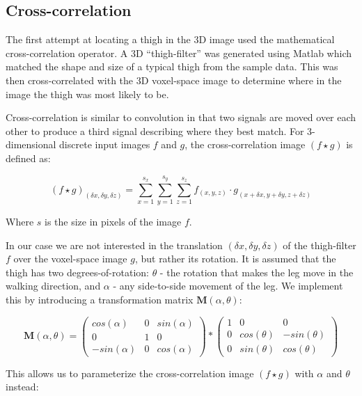 \subsection{Cross-correlation}

The first attempt at locating a thigh in the 3D image used the mathematical cross-correlation operator.
A 3D ``thigh-filter'' was generated using Matlab which matched the shape and size of a typical thigh from the sample data.
This was then cross-correlated with the 3D voxel-space image to determine where in the image the thigh was most likely to be.

\bigskip
\noindent Cross-correlation is similar to convolution in that two signals are moved over each other to produce a third signal describing where they best match.
For 3-dimensional discrete input images $f$ and $g$, the cross-correlation image $(f \star g)$ is defined as:

\begin{equation}
	(f \star g)_{(\delta x,\delta y,\delta z)} = \sum_{x=1}^{s_{x}} \sum_{y=1}^{s_{y}} \sum_{z=1}^{s_{z}} f_{(x,y,z)} \cdot g_{(x+\delta x,y+\delta y, z+\delta z)}
\end{equation}

Where $s$ is the size in pixels of the image $f$.

In our case we are not interested in the translation $(\delta x,\delta y,\delta z)$ of the thigh-filter $f$ over the voxel-space image $g$, but rather its rotation.
It is assumed that the thigh has two degrees-of-rotation: $\theta$ - the rotation that makes the leg move in the walking direction, and $\alpha$ - any side-to-side movement of the leg.
We implement this by introducing a transformation matrix $\mathbf{M}(\alpha,\theta)$:

\begin{equation}
	\mathbf{M}(\alpha,\theta) =
	\left(\begin{array}{ccc}
		cos(\alpha) & 0 & sin(\alpha) \\
		0 & 1 & 0 \\
		-sin(\alpha) & 0 & cos(\alpha)
	\end{array} \right)
	*
	\left(\begin{array}{ccc}
		1 & 0 & 0 \\
		0 & cos(\theta) & -sin(\theta) \\
		0 & sin(\theta) & cos(\theta)
	\end{array} \right)
\end{equation}

This allows us to parameterize the cross-correlation image $(f \star g)$ with $\alpha$ and $\theta$ instead:

